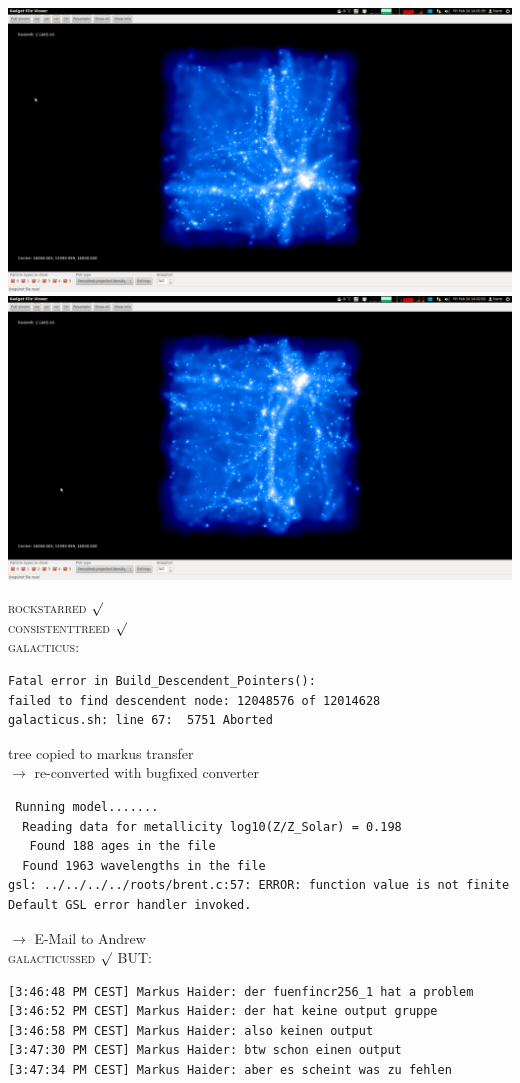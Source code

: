 \documentclass[a4paper,11pt,fleqn,oneside]{book}
\begin{document}
\includegraphics[scale=0.12]{fuenfincr256_1/1.png} 
\includegraphics[scale=0.12]{fuenfincr256_1/2.png}

\textsc{rockstarred} $\surd$ \\ \textsc{consistenttreed} $\surd$
\\ \textsc{galacticus}: 
\begin{verbatim}
Fatal error in Build_Descendent_Pointers():
failed to find descendent node: 12048576 of 12014628
galacticus.sh: line 67:  5751 Aborted  
\end{verbatim}
tree copied to markus transfer \\
$\rightarrow$ re-converted with bugfixed converter \\
\begin{verbatim}
 Running model....... 
  Reading data for metallicity log10(Z/Z_Solar) = 0.198
   Found 188 ages in the file
  Found 1963 wavelengths in the file
gsl: ../../../../roots/brent.c:57: ERROR: function value is not finite
Default GSL error handler invoked.
\end{verbatim}
$\rightarrow$ E-Mail to Andrew \\
\textsc{galacticussed} $\surd$
BUT: 
\begin{verbatim}
[3:46:48 PM CEST] Markus Haider: der fuenfincr256_1 hat a problem
[3:46:52 PM CEST] Markus Haider: der hat keine output gruppe
[3:46:58 PM CEST] Markus Haider: also keinen output
[3:47:30 PM CEST] Markus Haider: btw schon einen output
[3:47:34 PM CEST] Markus Haider: aber es scheint was zu fehlen
\end{verbatim}
\end{document}
